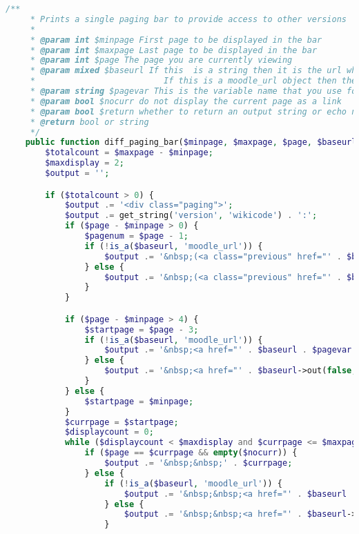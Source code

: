 \begin{lstlisting}[language=PHP]
    /**
     * Prints a single paging bar to provide access to other versions
     *
     * @param int $minpage First page to be displayed in the bar
     * @param int $maxpage Last page to be displayed in the bar
     * @param int $page The page you are currently viewing
     * @param mixed $baseurl If this  is a string then it is the url which will be appended with $pagevar, an equals sign and the page number.
     *                          If this is a moodle_url object then the pagevar param will be replaced by the page no, for each page.
     * @param string $pagevar This is the variable name that you use for the page number in your code (ie. 'tablepage', 'blogpage', etc)
     * @param bool $nocurr do not display the current page as a link
     * @param bool $return whether to return an output string or echo now
     * @return bool or string
     */
    public function diff_paging_bar($minpage, $maxpage, $page, $baseurl, $pagevar = 'page', $nocurr = false) {
        $totalcount = $maxpage - $minpage;
        $maxdisplay = 2;
        $output = '';

        if ($totalcount > 0) {
            $output .= '<div class="paging">';
            $output .= get_string('version', 'wikicode') . ':';
            if ($page - $minpage > 0) {
                $pagenum = $page - 1;
                if (!is_a($baseurl, 'moodle_url')) {
                    $output .= '&nbsp;(<a class="previous" href="' . $baseurl . $pagevar . '=' . $pagenum . '">' . get_string('previous') . '</a>)&nbsp;';
                } else {
                    $output .= '&nbsp;(<a class="previous" href="' . $baseurl->out(false, array($pagevar => $pagenum)) . '">' . get_string('previous') . '</a>)&nbsp;';
                }
            }

            if ($page - $minpage > 4) {
                $startpage = $page - 3;
                if (!is_a($baseurl, 'moodle_url')) {
                    $output .= '&nbsp;<a href="' . $baseurl . $pagevar . '=' . $minpage . '">' . $minpage . '</a>&nbsp;...';
                } else {
                    $output .= '&nbsp;<a href="' . $baseurl->out(false, array($pagevar => $minpage)) . '">' . $minpage . '</a>&nbsp;...';
                }
            } else {
                $startpage = $minpage;
            }
            $currpage = $startpage;
            $displaycount = 0;
            while ($displaycount < $maxdisplay and $currpage <= $maxpage) {
                if ($page == $currpage && empty($nocurr)) {
                    $output .= '&nbsp;&nbsp;' . $currpage;
                } else {
                    if (!is_a($baseurl, 'moodle_url')) {
                        $output .= '&nbsp;&nbsp;<a href="' . $baseurl . $pagevar . '=' . $currpage . '">' . $currpage . '</a>';
                    } else {
                        $output .= '&nbsp;&nbsp;<a href="' . $baseurl->out(false, array($pagevar => $currpage)) . '">' . $currpage . '</a>';
                    }


\end{lstlisting}
